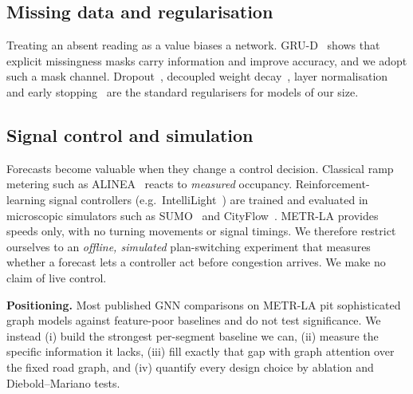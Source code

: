 \subsection{Missing data and regularisation}
Treating an absent reading as a value biases a network. GRU-D~\cite{che2018grud}
shows that explicit missingness masks carry information and improve accuracy, and we
adopt such a mask channel. Dropout~\cite{srivastava2014dropout}, decoupled weight
decay~\cite{loshchilov2019adamw}, layer normalisation~\cite{ba2016layernorm} and
early stopping~\cite{prechelt1998} are the standard regularisers for models of
our size.

\subsection{Signal control and simulation}
Forecasts become valuable when they change a control decision. Classical ramp
metering such as ALINEA~\cite{papageorgiou1991alinea} reacts to \emph{measured}
occupancy. Reinforcement-learning signal controllers (e.g.\
IntelliLight~\cite{wei2018intellilight}) are trained and evaluated in microscopic
simulators such as SUMO~\cite{krajzewicz2012sumo} and CityFlow~\cite{zhang2019cityflow}.
METR-LA provides speeds only, with no turning movements or signal timings. We
therefore restrict ourselves to an \emph{offline, simulated} plan-switching
experiment that measures whether a forecast lets a controller act before congestion
arrives. We make no claim of live control.

\textbf{Positioning.} Most published GNN comparisons on METR-LA pit
sophisticated graph models against feature-poor baselines and do not test
significance. We instead (i) build the strongest per-segment baseline we can,
(ii) measure the specific information it lacks, (iii) fill exactly that gap with
graph attention over the fixed road graph, and (iv) quantify every design choice by
ablation and Diebold--Mariano tests.
